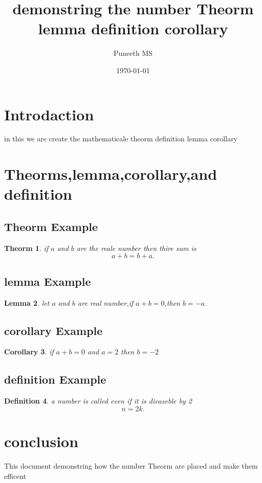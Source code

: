 \documentclass[a4paper,12pt]{article}
\newtheorem{theorm}{Theorm}[section]
\newtheorem{lemma}[theorm]{Lemma}
\newtheorem{definition}[theorm]{Definition}
\newtheorem{corollary}[theorm]{Corollary}
\begin{document}
\title{demonstring the number Theorm lemma definition corollary}
\author{Puneeth MS}
\date{\today}
\maketitle
\section*{Introdaction}
in this we are create the mathematicale theorm definition lemma corollary
\section{Theorms,lemma,corollary,and definition}
\subsection*{Theorm Example}
\begin{theorm}
if \(a\) and \(b\) are the reale number then thire sum is
\[a + b = b + a. \]  
\end{theorm}
\subsection*{lemma Example}
\begin{lemma}
    let \(a\) and \(b\) are real number,if \( a + b = 0\),then \( b = -a \). 
\end{lemma}
\subsection*{corollary Example}
\begin{corollary}
    if \( a + b = 0 \) and \(a=2\) then \(b = -2\)
\end{corollary}
\subsection*{definition Example}
\begin{definition}
    a number is called even if it is divaseble by 2
    \[
    n = 2k.
    \]
\end{definition}
\section{conclusion}
This document demonstring how the number Theorm are placed and make them efficent
\end{document}
